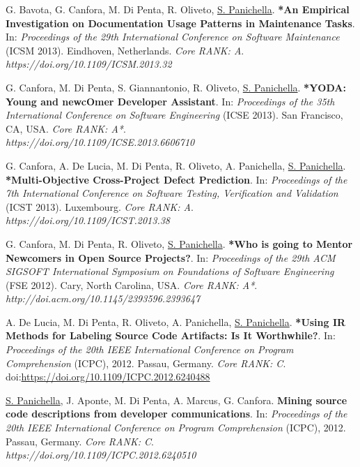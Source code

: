 \documentclass[10pt]{article}
\newcommand\doilink[1]{\href{http://dx.doi.org/#1}{#1}}
\newcommand\doi[1]{doi:\doilink{#1}}
\begin{document}
\begin{bibenum}
    \item  \label{C22}  G. Bavota, G. Canfora, M. Di Penta, R. Oliveto, \underline{S. Panichella}. \textbf{*An Empirical Investigation on Documentation Usage Patterns in Maintenance Tasks}. In: \emph{Proceedings of the 29th International Conference on Software Maintenance} (ICSM 2013). Eindhoven, Netherlands.  \textit{Core RANK: A}.
    \\\textit{https://doi.org/10.1109/ICSM.2013.32}

    \item  \label{C23}  G. Canfora, M. Di Penta, S. Giannantonio, R. Oliveto,  \underline{S. Panichella}. \textbf{*YODA: Young and newcOmer Developer Assistant}. In: \emph{Proceedings of the 35th International Conference on Software Engineering} (ICSE 2013). San Francisco, CA, USA.  \textit{Core RANK: A*}. \\\textit{https://doi.org/10.1109/ICSE.2013.6606710}

     \item  \label{C24}  G. Canfora, A. De Lucia, M. Di Penta, R. Oliveto, A. Panichella, \underline{S. Panichella}. \textbf{*Multi-Objective Cross-Project Defect Prediction}. In: \emph{Proceedings of the 7th International Conference on Software Testing, Verification and Validation} (ICST 2013). Luxembourg.  \textit{Core RANK: A}.
     \\\textit{https://doi.org/10.1109/ICST.2013.38}

     \item   \label{C25}  G. Canfora, M. Di Penta, R. Oliveto,  \underline{S. Panichella}. \textbf{*Who is going to Mentor Newcomers in Open Source Projects?}. In: \emph{Proceedings of the 29th ACM SIGSOFT International Symposium on Foundations of Software Engineering} (FSE 2012). Cary, North Carolina, USA.  \textit{Core RANK: A*}. \\\textit{http://doi.acm.org/10.1145/2393596.2393647}

     \item  \label{C26} A. De Lucia, M. Di Penta, R. Oliveto, A. Panichella, \underline{S. Panichella}. \textbf{*Using IR Methods for Labeling Source Code Artifacts: Is It Worthwhile?}. In: \emph{Proceedings of the 20th IEEE International Conference on Program Comprehension} (ICPC), 2012. Passau, Germany.  \textit{Core RANK: C}.
     \\\doi{https://doi.org/10.1109/ICPC.2012.6240488}

     \item  \label{C27}  \underline{S. Panichella}, J. Aponte, M. Di Penta, A. Marcus, G. Canfora. \textbf{Mining source code descriptions from developer communications}. In: \emph{Proceedings of the 20th IEEE International Conference on Program Comprehension} (ICPC), 2012. Passau, Germany.  \textit{Core RANK: C}.
     \\\textit{https://doi.org/10.1109/ICPC.2012.6240510}


\end{bibenum}
\end{document}

